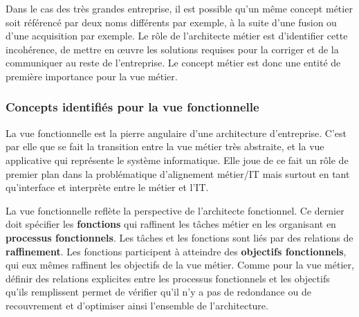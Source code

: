     Dans le cas des très grandes entreprise, il est possible qu'un même concept métier
    soit référencé par deux noms différents par exemple, à la suite d'une fusion ou d'une acquisition par exemple.
    Le rôle de l'architecte métier est d'identifier cette incohérence, de mettre en œuvre les solutions requises pour
    la corriger et de la communiquer au reste de l'entreprise.
    Le concept métier est donc une entité de première importance pour la vue métier.

    \subsubsection{Concepts identifiés pour la vue fonctionnelle}

    La vue fonctionnelle est la pierre angulaire d'une architecture d'entreprise. C'est par elle que se fait la transition entre la vue métier très abstraite, et la vue applicative qui représente le système informatique.
    Elle joue de ce fait un rôle de premier plan dans la problématique d'alignement métier/IT mais surtout en tant
    qu'interface et interprète entre le métier et l'IT.

    La vue fonctionnelle reflète la perspective de l'architecte fonctionnel. Ce dernier doit spécifier les \textbf{fonctions}
    qui raffinent les tâches métier en les organisant en \textbf{processus fonctionnels}. Les tâches et les fonctions
    sont liés par des relations de \textbf{raffinement}.
    Les fonctions participent à atteindre des \textbf{objectifs fonctionnels}, qui eux mêmes raffinent les objectifs
    de la vue métier. Comme pour la vue métier, définir des relations explicites entre les processus fonctionnels
    et les objectifs qu'ils remplissent permet de vérifier qu'il n'y a pas de redondance ou de recouvrement
    et d'optimiser ainsi l'ensemble de l'architecture.

